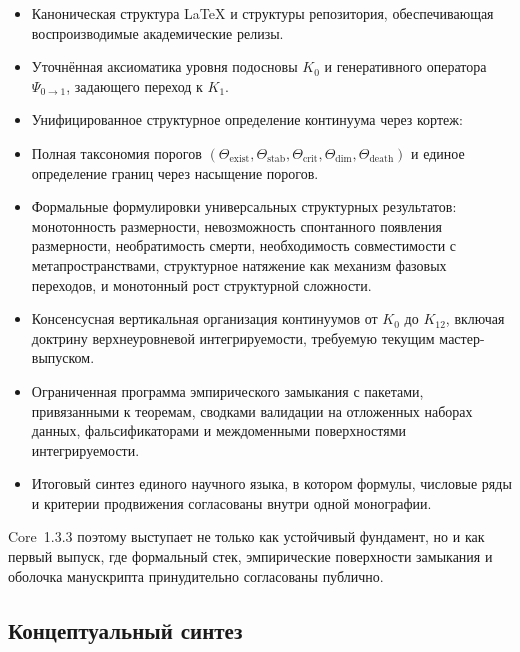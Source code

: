 \begin{itemize}
    \item Каноническая структура \LaTeX{} и структуры репозитория, обеспечивающая
          воспроизводимые академические релизы.
    \item Уточнённая аксиоматика уровня подосновы \(K_0\) и генеративного оператора
          \(\Psi_{0\to 1}\), задающего переход к \(K_1\).
    \item Унифицированное структурное определение континуума через кортеж:
          \\[
              K = \big(\Omega(K), A(K), P(t), J(t), \Theta(K), \partial\Omega(K), C(K), k(K,t)\big).
          \\]
    \item Полная таксономия порогов
          \((\Theta_{\mathrm{exist}}, \Theta_{\mathrm{stab}}, \Theta_{\mathrm{crit}},
            \Theta_{\mathrm{dim}}, \Theta_{\mathrm{death}})\)
          и единое определение границ через насыщение порогов.
    \item Формальные формулировки универсальных структурных результатов:
          монотонность размерности,
          невозможность спонтанного появления размерности,
          необратимость смерти,
          необходимость совместимости с метапространствами,
          структурное натяжение как механизм фазовых переходов,
          и монотонный рост структурной сложности.
    \item Консенсусная вертикальная организация континуумов от \(K_0\) до \(K_{12}\),
          включая доктрину верхнеуровневой интегрируемости, требуемую текущим
          мастер-выпуском.
    \item Ограниченная программа эмпирического замыкания с пакетами, привязанными к
          теоремам, сводками валидации на отложенных наборах данных, фальсификаторами
          и междоменными поверхностями интегрируемости.
    \item Итоговый синтез единого научного языка, в котором формулы, числовые ряды и
          критерии продвижения согласованы внутри одной монографии.
\end{itemize}

Core~1.3.3 поэтому выступает не только как устойчивый фундамент, но и как первый
выпуск, где формальный стек, эмпирические поверхности замыкания и оболочка
манускрипта принудительно согласованы публично.

\subsection{Концептуальный синтез}

